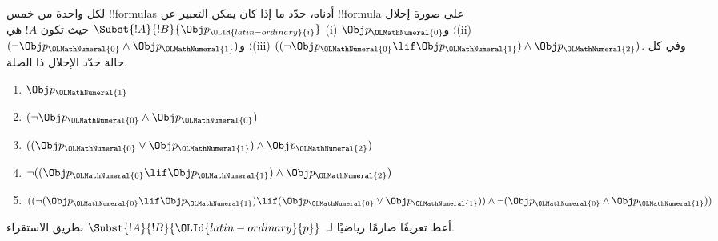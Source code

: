 \documentclass[../../../include/open-logic-section]{subfiles}
\begin{document}
\begin{prob} لكل واحدة من خمس !!{formula}s أدناه، حدّد ما إذا كان يمكن
 التعبير عن !!{formula} على صورة إحلال \( \Subst{!A}{!B}{\Obj p_\OLId{latin-ordinary}{i}} \)
 حيث تكون \( !A \) هي (i) \( \Obj p_\OLMathNumeral{0} \)؛ و(ii) \( ( \lnot \Obj p_\OLMathNumeral{0} \land \Obj
 p_\OLMathNumeral{1}) \)؛ و(iii) \( ( ( \lnot \Obj p_\OLMathNumeral{0} \lif \Obj p_\OLMathNumeral{1} ) \land \Obj
 p_\OLMathNumeral{2} ) \). وفي كل حالة حدّد الإحلال ذا الصلة.
  \begin{enumerate}
    \item \( \Obj p_\OLMathNumeral{1} \)
    \item \( ( \lnot \Obj p_\OLMathNumeral{0} \land \Obj p_\OLMathNumeral{0} ) \)
    \item \( ( ( \Obj p_\OLMathNumeral{0} \lor \Obj p_\OLMathNumeral{1} ) \land \Obj p_\OLMathNumeral{2} )  \)
    \item \( \lnot ( ( \Obj p_\OLMathNumeral{0} \lif \Obj p_\OLMathNumeral{1} ) \land \Obj p_\OLMathNumeral{2} ) \)
    \item \( (( \lnot ( \Obj p_\OLMathNumeral{0} \lif \Obj p_\OLMathNumeral{1} ) \lif ( \Obj p_\OLMathNumeral{0} \lor \Obj p_\OLMathNumeral{1} )) \land \lnot ( \Obj p_\OLMathNumeral{0} \land \Obj p_\OLMathNumeral{1} )) \)
  \end{enumerate}
\end{prob}

\begin{prob}
أعط تعريفًا صارمًا رياضيًا لـ~$\Subst{!A}{!B}{\OLId{latin-ordinary}{p}}$ بطريق
الاستقراء.
\end{prob}
\end{document}
